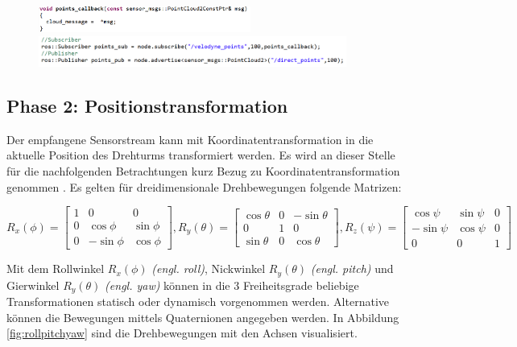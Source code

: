 \begin{figure}[H]
	\includegraphics[width=0.62\textwidth]{resources/sourcecode/callback.png} \\
	\includegraphics[width=0.9\textwidth]{resources/sourcecode/pubsub.png}
	\label{fig:pubsub}
\end{figure} 

\subsection{Phase 2: Positionstransformation}
\label{subsec:Phase}

Der empfangene Sensorstream kann mit Koordinatentransformation in die aktuelle Position des Drehturms transformiert werden. Es wird an dieser Stelle für die nachfolgenden Betrachtungen kurz Bezug zu Koordinatentransformation genommen \cite{Koordinaten}.
Es gelten für dreidimensionale Drehbewegungen folgende Matrizen:

$R_x(\phi ) =\begin{bmatrix}
	1&  0& 0\\ 
	0&  \cos\phi&  \sin\phi\\ 
	0&  -\sin\phi&  \cos\phi
\end{bmatrix}, R_y(\theta ) = \begin{bmatrix}
	\cos\theta&  0& -\sin\theta \\ 
	0&  1& 0\\ 
	\sin\theta &  0& \cos\theta 
\end{bmatrix}, R_z(\psi ) =\begin{bmatrix}
	\cos\psi& \sin\psi  & 0 \\ 
	-\sin\psi&  \cos\psi& 0 \\ 
	0&  0& 1
\end{bmatrix}$

Mit dem Rollwinkel $R_x(\phi)$ \textit{(engl. roll)}, Nickwinkel $R_y(\theta )$ \textit{(engl. pitch)} und Gierwinkel $R_y(\theta )$ \textit{(engl. yaw)} können in die 3 Freiheitsgrade beliebige Transformationen statisch oder dynamisch vorgenommen werden. Alternative können die Bewegungen mittels \ac{Quaternionen} angegeben werden. In Abbildung \ref{fig:rollpitchyaw} sind die Drehbewegungen mit den Achsen visualisiert.

